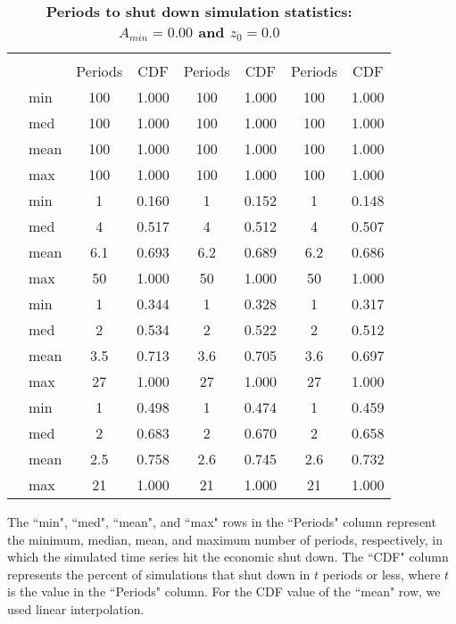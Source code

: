 \documentclass[letterpaper,12pt]{article}
\theoremstyle{definition}
\begin{document}
\begin{spacing}{1.5}
  \begin{table}[htbp]\centering\captionsetup{width=4.6in}
  \caption{\label{TabPer2GO_A0}\textbf{Periods to shut down simulation statistics: $A_{min}=0.00$ and $z_0=0.0$}}
    \begin{threeparttable}
    \begin{tabular}{>{\small}c >{\small}l| >{\small}c >{\small}c| >{\small}c >{\small}c| >{\small}c >{\small}c}
      \hline\hline
      & & \multicolumn{2}{c}{$k_{2,0}=0.11$} & \multicolumn{2}{c}{$k_{2,0}=0.14$} & \multicolumn{2}{c}{$k_{2,0}=0.17$} \\ \cline{3-8}
      & & Periods & CDF & Periods & CDF & Periods & CDF \\
      \hline
      \multirow{4}{*}{$\bar{H}=0.00$}
      & min & 100 & 1.000 & 100 & 1.000 & 100 & 1.000 \\
      & med & 100 & 1.000 & 100 & 1.000 & 100 & 1.000 \\
      & mean & 100 & 1.000 & 100 & 1.000 & 100 & 1.000 \\
      & max & 100 & 1.000 & 100 & 1.000 & 100 & 1.000 \\
      \hline
      \multirow{4}{*}{$\bar{H}=0.05$}
      & min & 1 & 0.160 & 1 & 0.152 & 1 & 0.148 \\
      & med & 4 & 0.517 & 4 & 0.512 & 4 & 0.507 \\
      & mean & 6.1 & 0.693 & 6.2 & 0.689 & 6.2 & 0.686 \\
      & max & 50 & 1.000 & 50 & 1.000 & 50 & 1.000 \\
      \hline
      \multirow{4}{*}{$\bar{H}=0.11$}
      & min & 1 & 0.344 & 1 & 0.328 & 1 & 0.317 \\
      & med & 2 & 0.534 & 2 & 0.522 & 2 & 0.512 \\
      & mean & 3.5 & 0.713 & 3.6 & 0.705 & 3.6 & 0.697 \\
      & max & 27 & 1.000 & 27 & 1.000 & 27 & 1.000 \\
      \hline
      \multirow{4}{*}{$\bar{H}=0.17$}
      & min & 1 & 0.498 & 1 & 0.474 & 1 & 0.459 \\
      & med & 2 & 0.683 & 2 & 0.670 & 2 & 0.658 \\
      & mean & 2.5 & 0.758 & 2.6 & 0.745 & 2.6 & 0.732 \\
      & max & 21 & 1.000 & 21 & 1.000 & 21 & 1.000 \\
      \hline\hline
    \end{tabular}
    \begin{tablenotes}
      \scriptsize{\item[]The ``min", ``med", ``mean", and ``max" rows in the ``Periods" column represent the minimum, median, mean, and maximum number of periods, respectively, in which the simulated time series hit the economic shut down. The ``CDF" column represents the percent of simulations that shut down in $t$ periods or less, where $t$ is the value in the ``Periods" column. For the CDF value of the ``mean" row, we used linear interpolation.}
    \end{tablenotes}
    \end{threeparttable}
  \end{table}


\end{spacing}
\end{document}
